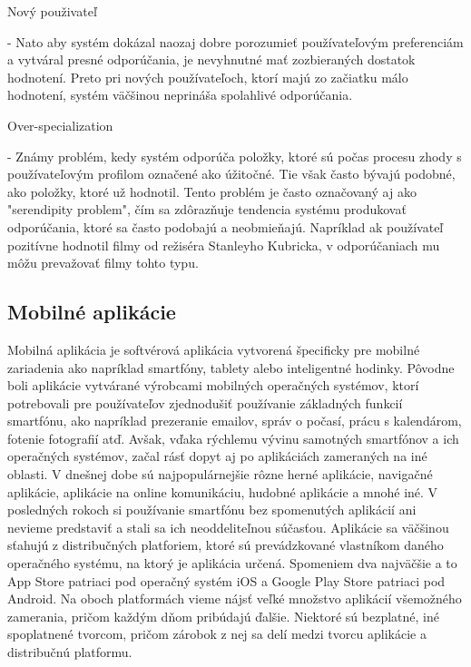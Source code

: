 \begin{itemize}[leftmargin=*]
	{\bf \item Nový použivateľ} - Nato aby systém dokázal naozaj dobre porozumieť používateľovým preferenciám a vytváral presné odporúčania, je nevyhnutné mať zozbieraných dostatok hodnotení. Preto pri nových používateľoch, ktorí majú zo začiatku málo hodnotení, systém väčšinou neprináša spolahlivé odporúčania. 
	{\bf \item Over-specialization} - Známy problém, kedy systém odporúča položky, ktoré sú počas procesu zhody s používateľovým profilom označené ako úžitočné. Tie však často bývajú podobné, ako položky, ktoré už hodnotil. Tento problém je často označovaný aj ako "serendipity problem", čím sa zdôrazňuje tendencia systému produkovať odporúčania, ktoré sa často podobajú a neobmieňajú. Napríklad ak používateľ pozitívne hodnotil filmy od režiséra Stanleyho Kubricka, v odporúčaniach mu môžu prevažovať filmy tohto typu. \\
	
\end{itemize}


\subsection{Mobilné aplikácie}
Mobilná aplikácia je softvérová aplikácia vytvorená špecificky pre mobilné zariadenia ako napríklad smartfóny, tablety alebo inteligentné hodinky. Pôvodne boli aplikácie vytvárané výrobcami mobilných operačných systémov, ktorí potrebovali pre používateľov zjednodušiť používanie základných funkcií smartfónu, ako napríklad prezeranie emailov, správ o počasí, prácu s kalendárom, fotenie fotografií atď. Avšak, vďaka rýchlemu vývinu samotných smartfónov a ich operačných systémov, začal rásť dopyt aj po aplikáciách zameraných na iné oblasti. V dnešnej dobe sú najpopulárnejšie rôzne herné aplikácie, navigačné aplikácie, aplikácie na online komunikáciu, hudobné aplikácie a mnohé iné. V posledných rokoch si používanie smartfónu bez spomenutých aplikácií ani nevieme predstaviť a stali sa ich neoddeliteľnou súčasťou. Aplikácie sa väčšinou sťahujú z distribučných platforiem, ktoré sú prevádzkované vlastníkom daného operačného systému, na ktorý je aplikácia určená. Spomeniem dva najväčšie a to App Store patriaci pod operačný systém iOS a Google Play Store patriaci pod Android. Na oboch platformách vieme nájsť veľké množstvo aplikácií všemožného zamerania, pričom každým dňom pribúdajú ďalšie. Niektoré sú bezplatné, iné spoplatnené tvorcom, pričom zárobok z nej sa delí medzi tvorcu aplikácie a distribučnú platformu. \\
